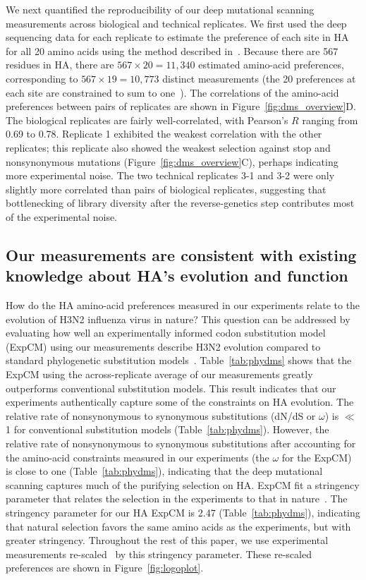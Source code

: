 \documentclass[9pt,twocolumn,twoside]{pnas-new}
\begin{document}
We next quantified the reproducibility of our deep mutational scanning measurements across biological and technical replicates. 
We first used the deep sequencing data for each replicate to estimate the preference of each site in HA for all 20 amino acids using the method described in~\cite{bloom2015software}.
Because there are 567 residues in HA, there are $567 \times 20 = 11,340$ estimated amino-acid preferences, corresponding to $567 \times 19 = 10,773$ distinct measurements (the 20 preferences at each site are constrained to sum to one~\cite{bloom2015software}).
The correlations of the amino-acid preferences between pairs of replicates are shown in Figure~\ref{fig:dms_overview}D.
The biological replicates are fairly well-correlated, with Pearson's $R$ ranging from 0.69 to 0.78. 
Replicate 1 exhibited the weakest correlation with the other replicates; this replicate also showed the weakest selection against stop and nonsynonymous mutations (Figure~\ref{fig:dms_overview}C), perhaps indicating more experimental noise.
The two technical replicates 3-1 and 3-2 were only slightly more correlated than pairs of biological replicates, suggesting that bottlenecking of library diversity after the reverse-genetics step contributes most of the experimental noise.

\subsection*{Our measurements are consistent with existing knowledge about HA's evolution and function}
How do the HA amino-acid preferences measured in our experiments relate to the evolution of H3N2 influenza virus in nature?
This question can be addressed by evaluating how well an experimentally informed codon substitution model (ExpCM) using our measurements describe H3N2 evolution compared to standard phylogenetic substitution models~\cite{bloom2017identification,hilton2017phydms}.
Table~\ref{tab:phydms} shows that the ExpCM using the across-replicate average of our measurements greatly outperforms conventional substitution models.
This result indicates that our experiments authentically capture some of the constraints on HA evolution. 
The relative rate of nonsynonymous to synonymous substitutions (dN/dS or $\omega$) is $\ll$1 for conventional substitution models (Table~\ref{tab:phydms}).
However, the relative rate of nonsynonymous to synonymous substitutions after accounting for the amino-acid constraints measured in our experiments (the $\omega$ for the ExpCM) is close to one (Table~\ref{tab:phydms}), indicating that the deep mutational scanning captures much of the purifying selection on HA.
ExpCM fit a stringency parameter that relates the selection in the experiments to that in nature~\cite{bloom2017identification,hilton2017phydms}.
The stringency parameter for our HA ExpCM is 2.47 (Table~\ref{tab:phydms}), indicating that natural selection favors the same amino acids as the experiments, but with greater stringency.
Throughout the rest of this paper, we use experimental measurements re-scaled~\cite{bloom2017identification,hilton2017phydms} by this stringency parameter.
These re-scaled preferences are shown in Figure~\ref{fig:logoplot}.
\end{document}
